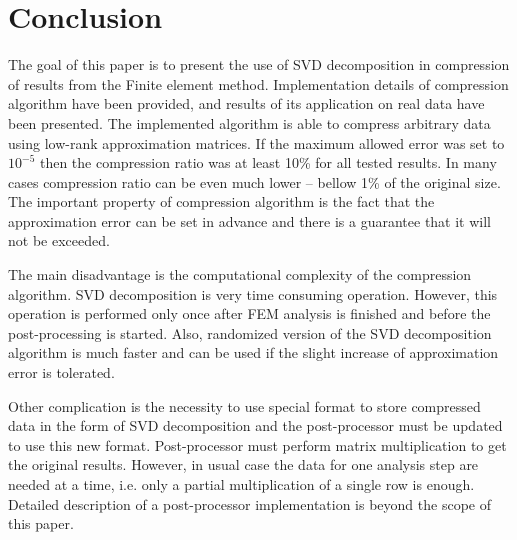 \section{Conclusion}
\label{sec:conclusion}

The goal of this paper is to present the use of SVD decomposition in compression of results from the Finite element method. Implementation details of compression algorithm have been provided, and results of its application on real data have been presented. The implemented algorithm is able to compress arbitrary data using low-rank approximation matrices. If the maximum allowed error was set to $10^{-5}$ then the compression ratio was at least 10\% for all tested results. In many cases compression ratio can be even much lower -- bellow 1\% of the original size. The important property of compression algorithm is the fact that the approximation error can be set in advance and there is a guarantee that it will not be exceeded.

The main disadvantage is the computational complexity of the compression algorithm. SVD decomposition is very time consuming operation. However, this operation is performed only once after FEM analysis is finished and before the post-processing is started. Also, randomized version of the SVD decomposition algorithm is much faster and can be used if the slight increase of approximation error is tolerated.

Other complication is the necessity to use special format to store compressed data in the form of SVD decomposition and the post-processor must be updated to use this new format. Post-processor must perform matrix multiplication to get the original results. However, in usual case the data for one analysis step are needed at a time, i.e. only a partial multiplication of a single row is enough. Detailed description of a post-processor implementation is beyond the scope of this paper.
